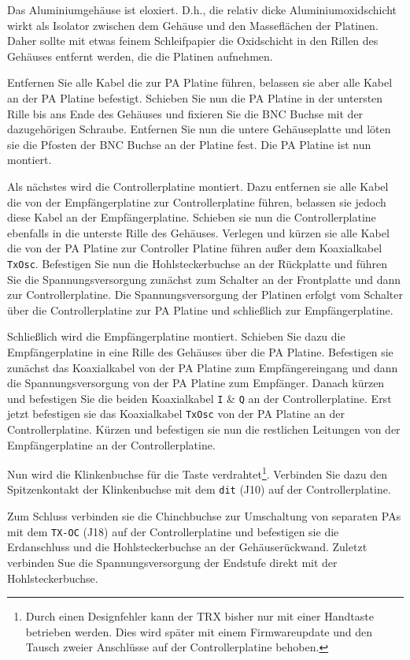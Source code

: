 \documentclass[10pt, a4paper]{paper}
\newcommand{\warn}[1]{{\color{red} #1}}
\newcommand{\con}[1]{\texttt{#1}}
\begin{document}
Das Aluminiumgehäuse ist eloxiert. D.h., die relativ dicke Aluminiumoxidschicht wirkt als Isolator zwischen dem Gehäuse und den Masseflächen der Platinen. Daher sollte mit etwas feinem Schleifpapier die Oxidschicht in den Rillen des Gehäuses entfernt werden, die die Platinen aufnehmen. 

Entfernen Sie alle Kabel die zur PA Platine führen, belassen sie aber alle Kabel an der PA Platine befestigt. Schieben Sie nun die PA Platine in der untersten Rille bis ans Ende des Gehäuses und fixieren Sie die BNC Buchse mit der dazugehörigen Schraube. Entfernen Sie nun die untere Gehäuseplatte und löten sie die Pfosten der BNC Buchse an der Platine fest. Die PA Platine ist nun montiert.

Als nächstes wird die Controllerplatine montiert. Dazu entfernen sie alle Kabel die von der Empfängerplatine zur Controllerplatine führen, belassen sie jedoch diese Kabel an der Emp\-fän\-ger\-pla\-ti\-ne. Schieben sie nun die Controllerplatine ebenfalls in die unterste Rille des Gehäuses. Verlegen und kürzen sie alle Kabel die von der PA Platine zur Controller Platine führen außer dem Koaxialkabel \con{TxOsc}. Befestigen Sie nun die Hohlsteckerbuchse an der Rückplatte und führen Sie die Spannungsversorgung zunächst zum Schalter an der Frontplatte und dann zur Controllerplatine. Die Spannungsversorgung der Platinen erfolgt vom Schalter über die Controllerplatine zur PA Platine und schließlich zur Empfängerplatine. 

Schließlich wird die Empfängerplatine montiert. Schieben Sie dazu die Empfängerplatine in eine Rille des Gehäuses über die PA Platine. Befestigen sie zunächst das Koaxialkabel von der PA Platine zum Empfängereingang und dann die Spannungsversorgung von der PA Platine zum Empfänger.
Danach kürzen und befestigen Sie die beiden Koaxialkabel \con{I} \& \con{Q} an der Controllerplatine. Erst jetzt befestigen sie das Koaxialkabel \con{TxOsc} von der PA Platine an der Controllerplatine. Kürzen und befestigen sie nun die restlichen Leitungen von der Empfängerplatine an der Controllerplatine. 

Nun wird die Klinkenbuchse für die Taste verdrahtet\footnote{\warn{Durch einen Designfehler kann der TRX bisher nur mit einer Handtaste betrieben werden. Dies wird später mit einem Firmwareupdate und den Tausch zweier Anschlüsse auf der Controllerplatine behoben.}}. Verbinden Sie dazu den Spitzenkontakt der Klinkenbuchse mit dem \con{dit} (J10) auf der Controllerplatine. 

Zum Schluss verbinden sie die Chinchbuchse zur Umschaltung von separaten PAs mit dem \con{TX-OC} (J18) auf der Controllerplatine und befestigen sie die Erdanschluss und die Hohlsteckerbuchse an der Gehäuserückwand. Zuletzt verbinden Sue die Spannungsversorgung der Endstufe direkt mit der Hohlsteckerbuchse.
\end{document}
